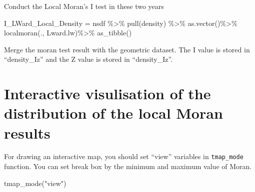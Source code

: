 \documentclass[
]{book}
\newenvironment{Shaded}{\begin{snugshade}}{\end{snugshade}}
\newcommand{\AttributeTok}[1]{\textcolor[rgb]{0.77,0.63,0.00}{#1}}
\newcommand{\FunctionTok}[1]{\textcolor[rgb]{0.00,0.00,0.00}{#1}}
\newcommand{\NormalTok}[1]{#1}
\newcommand{\OtherTok}[1]{\textcolor[rgb]{0.56,0.35,0.01}{#1}}
\newcommand{\SpecialCharTok}[1]{\textcolor[rgb]{0.00,0.00,0.00}{#1}}
\newcommand{\StringTok}[1]{\textcolor[rgb]{0.31,0.60,0.02}{#1}}
\begin{document}
Conduct the Local Moran's I test in these two years

\begin{Shaded}
\begin{Highlighting}[]
\NormalTok{ I\_LWard\_Local\_Density }\OtherTok{=}\NormalTok{ nsdf }\SpecialCharTok{\%\textgreater{}\%}
   \FunctionTok{pull}\NormalTok{(density) }\SpecialCharTok{\%\textgreater{}\%}
   \FunctionTok{as.vector}\NormalTok{()}\SpecialCharTok{\%\textgreater{}\%}
   \FunctionTok{localmoran}\NormalTok{(., Lward.lw)}\SpecialCharTok{\%\textgreater{}\%}
   \FunctionTok{as\_tibble}\NormalTok{()}
\end{Highlighting}
\end{Shaded}

Merge the moran test result with the geometric dataset. The I value is stored in ``density\_Iz'' and the Z value is stored in ``density\_Iz''.

\begin{Shaded}
\end{Shaded}

\hypertarget{interactive-visulisation-of-the-distribution-of-the-local-moran-results}{%
\section{Interactive visulisation of the distribution of the local Moran results}\label{interactive-visulisation-of-the-distribution-of-the-local-moran-results}}

For drawing an interactive map, you should set ``view'' variables in \texttt{tmap\_mode} function. You can set break box by the minimum and maximum value of Moran.

\begin{Shaded}
\begin{Highlighting}[]
\FunctionTok{tmap\_mode}\NormalTok{(}\StringTok{"view"}\NormalTok{)}
\end{Highlighting}
\end{Shaded}
\end{document}
